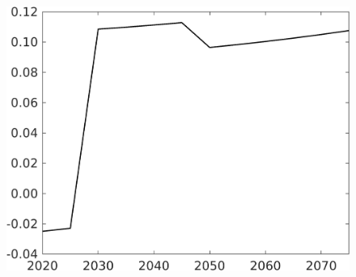 \begin{figure}[h!!]
\begin{minipage}[]{0.32\textwidth}
\end{minipage}
\begin{minipage}[]{0.32\textwidth}
	\includegraphics[width=1\textwidth]{../../codding_model/own_basedOnFried/optimalPol_190722_tidiedUp/figures/all_July22/taul_SingleAltPolOPT_T_NoTaus_regime3_spillover0_noskill1_sep1_xgrowth0_etaa0.79.png}
\end{minipage}


\end{figure}

